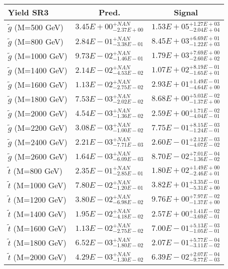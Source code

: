 \documentclass{article}
\begin{document}
 \begin{center}
 \begin{tabular}{ |l|c|c| } 
 \hline
 Yield SR3 & Pred. & Signal \\
 \hline
 \hline
 $\tilde{g}$ (M=500 GeV) & $3.45E+00^{+NAN}_{-2.37E+00}$ & $1.53E+05^{+1.27E+03}_{-2.04E+04}$ \\
 \hline
 $\tilde{g}$ (M=800 GeV) & $2.84E-01^{+NAN}_{-3.38E-01}$ & $8.45E+03^{+6.69E+01}_{-1.22E+03}$ \\
 \hline
 $\tilde{g}$ (M=1000 GeV) & $9.73E-02^{+NAN}_{-1.46E-01}$ & $1.79E+03^{+7.69E+00}_{-2.60E+02}$ \\
 \hline
 $\tilde{g}$ (M=1400 GeV) & $2.14E-02^{+NAN}_{-4.53E-02}$ & $1.07E+02^{+8.19E-01}_{-1.65E+01}$ \\
 \hline
 $\tilde{g}$ (M=1600 GeV) & $1.13E-02^{+NAN}_{-2.75E-02}$ & $2.93E+01^{+1.49E-01}_{-4.64E+00}$ \\
 \hline
 $\tilde{g}$ (M=1800 GeV) & $7.53E-03^{+NAN}_{-2.02E-02}$ & $8.68E+00^{+5.03E-02}_{-1.37E+00}$ \\
 \hline
 $\tilde{g}$ (M=2000 GeV) & $4.54E-03^{+NAN}_{-1.36E-02}$ & $2.59E+00^{+1.71E-02}_{-4.04E-01}$ \\
 \hline
 $\tilde{g}$ (M=2200 GeV) & $3.08E-03^{+NAN}_{-1.00E-02}$ & $7.75E-01^{+8.15E-03}_{-1.24E-01}$ \\
 \hline
 $\tilde{g}$ (M=2400 GeV) & $2.21E-03^{+NAN}_{-7.71E-03}$ & $2.60E-01^{+2.12E-03}_{-4.07E-02}$ \\
 \hline
 $\tilde{g}$ (M=2600 GeV) & $1.64E-03^{+NAN}_{-6.09E-03}$ & $8.70E-02^{+7.01E-04}_{-1.36E-02}$ \\
 \hline
 $\tilde{t}$ (M=800 GeV) & $2.35E-01^{+NAN}_{-2.85E-01}$ & $1.80E+02^{+1.49E+00}_{-2.46E+01}$ \\
 \hline
 $\tilde{t}$ (M=1000 GeV) & $7.80E-02^{+NAN}_{-1.20E-01}$ & $3.82E+01^{+3.35E-01}_{-5.31E+00}$ \\
 \hline
 $\tilde{t}$ (M=1200 GeV) & $3.80E-02^{+NAN}_{-6.98E-02}$ & $9.76E+00^{+7.97E-02}_{-1.37E+00}$ \\
 \hline
 $\tilde{t}$ (M=1400 GeV) & $1.95E-02^{+NAN}_{-4.18E-02}$ & $2.57E+00^{+1.41E-02}_{-3.69E-01}$ \\
 \hline
 $\tilde{t}$ (M=1600 GeV) & $1.13E-02^{+NAN}_{-2.75E-02}$ & $7.00E-01^{+5.13E-03}_{-1.05E-01}$ \\
 \hline
 $\tilde{t}$ (M=1800 GeV) & $6.52E-03^{+NAN}_{-1.80E-02}$ & $2.07E-01^{+5.77E-04}_{-3.11E-02}$ \\
 \hline
 $\tilde{t}$ (M=2000 GeV) & $4.29E-03^{+NAN}_{-1.30E-02}$ & $6.39E-02^{+2.07E-04}_{-9.77E-03}$ \\

\end{tabular}
\end{center}
\end{document}
